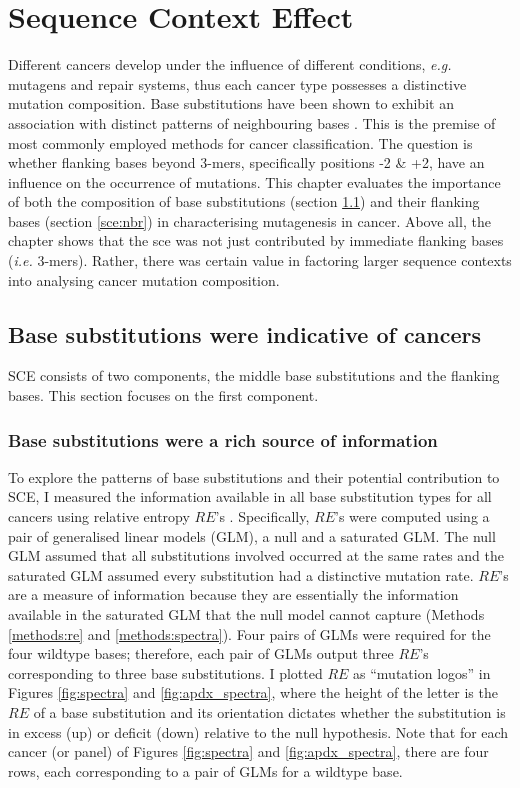 \chapter{Sequence Context Effect}\label{sce}

Different cancers develop under the influence of different conditions, \textit{e.g.} mutagens and repair systems, thus each cancer type possesses a distinctive mutation composition. Base substitutions have been shown to exhibit an association with distinct patterns of neighbouring bases \citep{Zhu2017,Zhu2020,Vinson2012CGMethylation}. This is the premise of most commonly employed methods for cancer classification. The question is whether flanking bases beyond 3-mers, specifically positions -2 \& +2, have an influence on the occurrence of mutations. This chapter evaluates the importance of both the composition of base substitutions (section \ref{sce:spectra}) and their flanking bases (section \ref{sce:nbr}) in characterising mutagenesis in cancer. Above all, the chapter shows that the \gls{sce} was not just contributed by immediate flanking bases (\textit{i.e.} 3-mers). Rather, there was certain value in factoring larger sequence contexts into analysing cancer mutation composition.

\section{Base substitutions were indicative of cancers}\label{sce:spectra}
SCE consists of two components, the middle base substitutions and the flanking bases. This section focuses on the first component.

\subsection{Base substitutions were a rich source of information}
To explore the patterns of base substitutions and their potential contribution to SCE, I measured the information available in all base substitution types for all cancers using relative entropy $RE$'s \citep{Zhu2017}. Specifically, $RE$'s were computed using a pair of generalised linear models (GLM), a null and a saturated GLM. The null GLM assumed that all substitutions involved occurred at the same rates and the saturated GLM assumed every substitution had a distinctive mutation rate. $RE$'s are a measure of information because they are essentially the information available in the saturated GLM that the null model cannot capture (Methods \ref{methods:re} and \ref{methods:spectra}). Four pairs of GLMs were required for the four wildtype bases; therefore, each pair of GLMs output three $RE$'s corresponding to three base substitutions. I plotted $RE$ as ``mutation logos'' in Figures \ref{fig:spectra} and \ref{fig:apdx_spectra}, where the height of the letter is the $RE$ of a base substitution and its orientation dictates whether the substitution is in excess (up) or deficit (down) relative to the null hypothesis. Note that for each cancer (or panel) of Figures \ref{fig:spectra} and \ref{fig:apdx_spectra}, there are four rows, each corresponding to a pair of GLMs for a wildtype base. 

